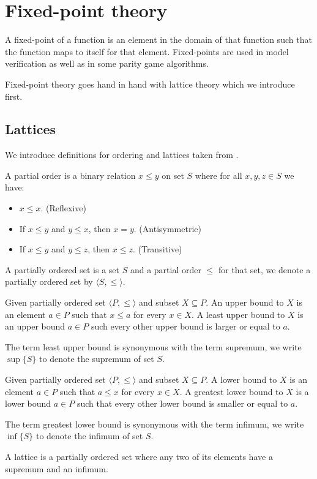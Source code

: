 \section{Fixed-point theory} 
A fixed-point of a function is an element in the domain of that function such that the function maps to itself for that element. Fixed-points are used in model verification as well as in some parity game algorithms.

Fixed-point theory goes hand in hand with lattice theory which we introduce first.
\subsection{Lattices}
We introduce definitions for ordering and lattices taken from \cite{birkhoff1940lattice}.
\begin{definition}
	A partial order is a binary relation $x \leq y$ on set $S$ where for all $x,y,z \in S$ we have:
	\begin{itemize}
		\item $x \leq x$. (Reflexive)
		\item If $x \leq y$ and $y \leq x$, then $x=y$. (Antisymmetric)
		\item If $x \leq y$ and $y \leq z$, then $x \leq z$. (Transitive)
	\end{itemize}
\end{definition}

\begin{definition}
	A partially ordered set is a set $S$ and a partial order $\leq$ for that set, we denote a partially ordered set by $\langle S, \leq \rangle$.
\end{definition}

\begin{definition}
	Given partially ordered set $\langle P,\leq \rangle$ and subset $X \subseteq P$. An upper bound to $X$ is an element $a \in P$ such that $x \leq a$ for every $x\in X$. A least upper bound to $X$ is an upper bound $a \in P$ such every other upper bound is larger or equal to $a$.
\end{definition}
The term least upper bound is synonymous with the term supremum, we write $\sup \{ S \}$ to denote the supremum of set $S$.
\begin{definition}
	Given partially ordered set $\langle P,\leq \rangle$ and subset $X \subseteq P$. A lower bound to $X$ is an element $a \in P$ such that $a \leq x$ for every $x\in X$. A greatest lower bound to $X$ is a lower bound $a \in P$ such that every other lower bound is smaller or equal to $a$.
\end{definition}
The term greatest lower bound is synonymous with the term infimum, we write $\inf \{ S\}$ to denote the infimum of set $S$.
\begin{definition}
	A lattice is a partially ordered set where any two of its elements have a supremum and an infimum.
\end{definition}

